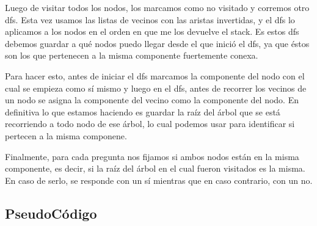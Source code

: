 Luego de visitar todos los nodos, los marcamos como no visitado y corremos otro dfs. Esta vez usamos las listas de vecinos con las aristas invertidas, y el dfs lo aplicamos a los nodos en el orden en que me los devuelve el stack. Es estos dfs debemos guardar a qué nodos puedo llegar desde el que inició el dfs, ya que éstos son los que pertenecen a la misma componente fuertemente conexa.\newline

Para hacer esto, antes de iniciar el dfs marcamos la componente del nodo con el cual se empieza como sí mismo y luego en el dfs, antes de recorrer los vecinos de un nodo se asigna la componente del vecino como la componente del nodo. En definitiva lo que estamos haciendo es guardar la raíz del árbol que se está recorriendo a todo nodo de ese árbol, lo cual podemos usar para identificar si pertecen a la misma componene.\newline

Finalmente, para cada pregunta nos fijamos si ambos nodos están en la misma componente, es decir, si la raíz del árbol en el cual fueron visitados es la misma. En caso de serlo, se responde con un sí mientras que en caso contrario, con un no.\newline


\subsection{PseudoCódigo}


